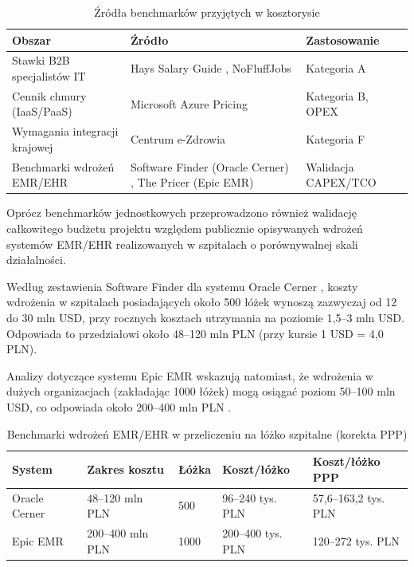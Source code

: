 \begin{table}[h]
\centering
\small
\renewcommand{\arraystretch}{1.2}
\begin{tabular}{|p{4.2cm}|p{5.8cm}|p{3.2cm}|}
\hline
\rowcolor{gray!20}\textbf{Obszar} & \textbf{Źródło} & \textbf{Zastosowanie} \\
\hline
Stawki B2B specjalistów IT & Hays Salary Guide \cite{Hays_2026}, NoFluffJobs \cite{NoFluffJobs_2025} & Kategoria A \\
\hline
Cennik chmury (IaaS/PaaS) & Microsoft Azure Pricing \cite{Azure_Pricing_2026} & Kategoria B, OPEX \\
\hline
Wymagania integracji krajowej & Centrum e-Zdrowia \cite{CeZ_P1_2025} & Kategoria F \\
\hline
Benchmarki wdrożeń EMR/EHR & Software Finder (Oracle Cerner) \cite{SoftwareFinder_Cerner_2026}, The Pricer (Epic EMR) \cite{ThePricer_Epic_2024} & Walidacja CAPEX/TCO \\
\hline
\end{tabular}
\caption{Źródła benchmarków przyjętych w kosztorysie}
\label{tab:benchmarki}
\end{table}

Oprócz benchmarków jednostkowych przeprowadzono również walidację całkowitego budżetu projektu względem publicznie opisywanych wdrożeń systemów EMR/EHR realizowanych w szpitalach o porównywalnej skali działalności.

Według zestawienia Software Finder dla systemu Oracle Cerner \cite{SoftwareFinder_Cerner_2026}, koszty wdrożenia w szpitalach posiadających około 500 łóżek wynoszą zazwyczaj od 12 do 30 mln USD, przy rocznych kosztach utrzymania na poziomie 1,5–3 mln USD. Odpowiada to przedziałowi około 48–120 mln PLN (przy kursie 1 USD = 4,0 PLN).

Analizy dotyczące systemu Epic EMR wskazują natomiast, że wdrożenia w dużych organizacjach (zakładając 1000 łóżek) mogą osiągać poziom 50–100 mln USD, co odpowiada około 200–400 mln PLN \cite{ThePricer_Epic_2024}.

\begin{table}[h]
\centering
\small
\renewcommand{\arraystretch}{1.2}
\setlength{\tabcolsep}{4pt}

\begin{tabular}{|p{2.8cm}|p{2.6cm}|p{1.6cm}|p{2.2cm}|p{2.6cm}|}
\hline
\rowcolor{gray!20}
\textbf{System} & \textbf{Zakres kosztu} & \textbf{Łóżka} & \textbf{Koszt/łóżko} & \textbf{Koszt/łóżko PPP} \\
\hline

Oracle Cerner &
48--120 mln PLN &
500 &
96--240 tys. PLN &
57,6--163,2 tys. PLN \\
\hline

Epic EMR &
200--400 mln PLN &
1000 &
200--400 tys. PLN &
120--272 tys. PLN \\
\hline

\end{tabular}

\caption{Benchmarki wdrożeń EMR/EHR w przeliczeniu na łóżko szpitalne (korekta PPP)}
\label{tab:per_bed_benchmark}
\end{table}


